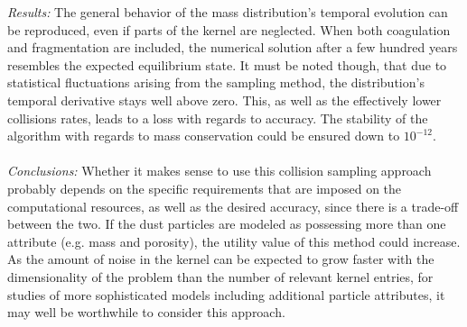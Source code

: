 \textit{Results:}
The general behavior of the mass distribution's temporal evolution can be reproduced, even if 
parts of the kernel are neglected.
When both coagulation and fragmentation are included, the numerical solution after a few hundred 
years resembles the expected equilibrium state.
It must be noted though, that
due to statistical fluctuations arising from the sampling method, the distribution's temporal 
derivative stays well above zero. This, as well as the effectively lower collisions rates,
leads to a loss with regards to accuracy. The stability of the algorithm with regards to mass 
conservation could be ensured down to $10^{-12}$.
\\ \ \\
\textit{Conclusions:}
Whether it makes sense to use this collision sampling approach probably depends on the specific 
requirements that are imposed on the computational resources, as well as the desired accuracy, since 
there is a trade-off between the two. 
If the dust particles are modeled as possessing more than one attribute (e.g. mass and porosity),
the utility value of this method could increase.
As the amount of noise in the kernel can be expected to grow faster with the dimensionality of the 
problem than the number of relevant kernel entries, for studies of more sophisticated models
including additional particle attributes, it may well be worthwhile to consider this approach.

